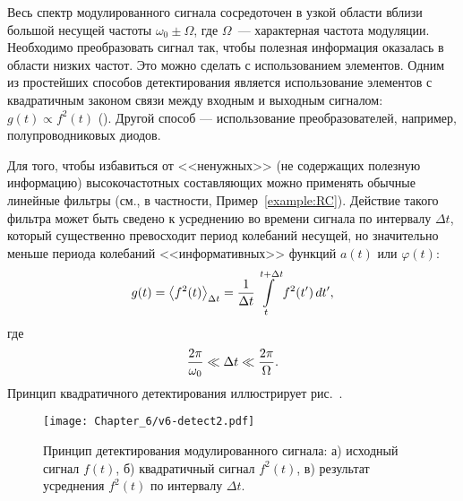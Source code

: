 Весь спектр модулированного сигнала сосредоточен в узкой области
вблизи большой несущей частоты $\omega_0\pm \Omega$, где $\Omega$~---
характерная частота модуляции. Необходимо преобразовать сигнал так,
чтобы полезная информация оказалась в области низких частот. Это можно
сделать с использованием  элементов. 
Одним из простейших способов детектирования является использование 
элементов с квадратичным законом связи 
между входным и выходным сигналом:
$g(t)\propto f^2(t)$ ().
Другой способ --- использование 
преобразователей, например, полупроводниковых диодов.

Для того, чтобы избавиться от <<ненужных>> (не содержащих полезную
информацию) высокочастотных составляющих можно применять обычные линейные
фильтры (см., в частности, Пример~\ref{example:RC}). Действие такого фильтра может быть сведено к усреднению во времени
сигнала по интервалу $\Delta t$, который существенно превосходит период
колебаний несущей, но значительно меньше периода колебаний <<информативных>>
функций $a(t)$ или $\varphi(t)$:
\begin{equation}
    \eqmark{averages-sq}
g(t) = \left<f^2(t)\right>_{\Delta t} = \frac{1}{\Delta t}
\int\limits_{t}^{t+\Delta t} f^2(t')\,dt',
\end{equation}
где
\begin{equation}
    \eqmark{averages-cond}
    \frac{2\pi}{\omega_0} \ll \Delta t \ll \frac{2\pi}{\Omega}.
\end{equation}
Принцип квадратичного детектирования иллюстрирует рис.~.
\begin{figure}[h]
 \texttt{[image: Chapter\_6/v6-detect2.pdf]}
 \caption{Принцип детектирования модулированного сигнала:
     а) исходный сигнал $f(t)$, б) квадратичный сигнал
 $f^2(t)$, в) результат усреднения $f^2(t)$ по интервалу $\Delta t$.
}
\end{figure}

